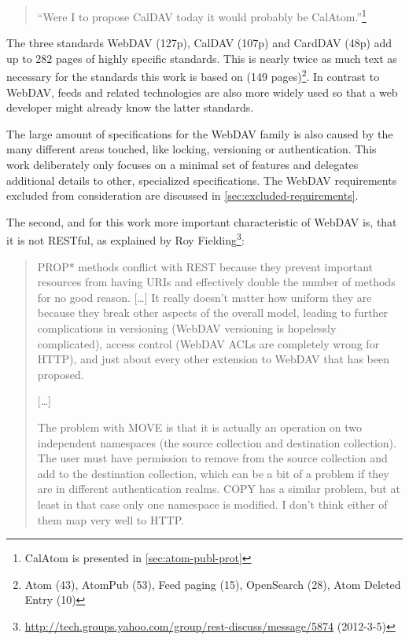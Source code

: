 \documentclass[11pt,a4paper,headsepline,twoside]{scrartcl}		%
\newcommand{\citeurl}[2]{\url{#1} (#2)}
\begin{document}
\begin{quote}
``Were I to propose CalDAV today it would probably be CalAtom.''\footnote{CalAtom is presented in \autoref{sec:atom-publ-prot}}
\end{quote}

The three standards WebDAV (127p), CalDAV (107p) and CardDAV (48p) add up to 282
pages of highly specific standards. This is nearly twice as much text as
necessary for the standards this work is based on (149 pages)\footnote{Atom
  (43), AtomPub (53), Feed paging (15), OpenSearch (28), Atom Deleted Entry
  (10)}. In contrast to WebDAV, feeds and related technologies are also more
widely used so that a web developer might already know the latter standards.

The large amount of specifications for the WebDAV family is also caused by the
many different areas touched, like locking, versioning or authentication. This
work deliberately only focuses on a minimal set of features and delegates
additional details to other, specialized specifications. The WebDAV requirements
excluded from consideration are discussed in \ref{sec:excluded-requirements}.

The second, and for this work more important characteristic of WebDAV is, that it
is not RESTful, as explained by Roy
Fielding\footnote{\citeurl{http://tech.groups.yahoo.com/group/rest-discuss/message/5874}{2012-3-5}}:

\begin{quotation}
  PROP* methods conflict with REST because they prevent important resources from
  having URIs and effectively double the number of methods for no good
  reason. [\ldots] It really doesn't matter how uniform they are because they
  break other aspects of the overall model, leading to further complications in
  versioning (WebDAV versioning is hopelessly complicated), access control
  (WebDAV ACLs are completely wrong for HTTP), and just about every other
  extension to WebDAV that has been proposed.

  [\ldots]

  The problem with MOVE is that it is actually an operation on two independent
  namespaces (the source collection and destination collection). The user must
  have permission to remove from the source collection and add to the
  destination collection, which can be a bit of a problem if they are in
  different authentication realms. COPY has a similar problem, but at least in
  that case only one namespace is modified. I don't think either of them map
  very well to HTTP.
\end{quotation}
\end{document}
